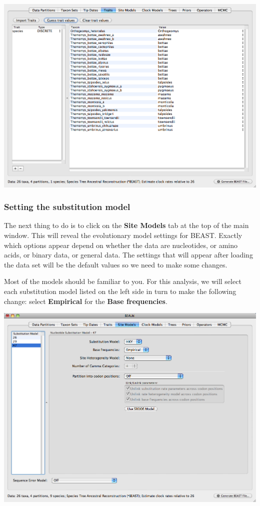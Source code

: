 \documentclass[12pt]{article}
\begin{document}
\includegraphics[scale=0.4]{figures/BEAUti_Trait2}

\medskip{}

\subsubsection*{Setting the substitution model}

The next thing to do is to click on the {\bf Site Models} tab at the top of the
main window. This will reveal the evolutionary model settings for
BEAST. Exactly which options appear depend on whether the data are
nucleotides, or amino acids, or binary data, or general data.
The settings that will appear after loading the data set will
be the default values so we need to make some changes. 

Most of the models should be familiar to you. For this analysis, we
will select each substitution model listed on the 
left side in turn to make the following change: select \textbf{Empirical} for the 
\textbf{Base frequencies}. 
\medskip{}

\includegraphics[scale=0.4]{figures/BEAUti_SiteModel}
\end{document}
